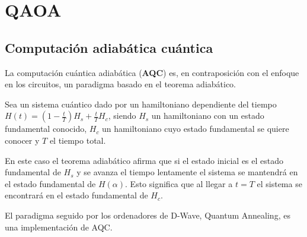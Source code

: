 \section{QAOA}


\subsection{Computación adiabática cuántica}

La computación cuántica adiabática (\textbf{AQC}) es, en contraposición con el enfoque en los circuitos, un paradigma basado en el teorema adiabático.  %

Sea un sistema cuántico dado por un hamiltoniano dependiente del tiempo $H(t) = (1-\frac{t}{T})H_s + \frac{t}{T}H_c$, siendo $H_s$ un hamiltoniano con un estado fundamental conocido, $H_c$ un hamiltoniano cuyo estado fundamental se quiere conocer y $T$ el tiempo total.

En este caso el teorema adiabático afirma que si el estado inicial es el estado fundamental de $H_s$ y se avanza el tiempo lentamente el sistema se mantendrá en el estado fundamental de $H(\alpha)$. Esto significa que al llegar a $t=T$ el sistema se encontrará en el estado fundamental de $H_c$.

El paradigma seguido por los ordenadores de D-Wave, Quantum Annealing, es una implementación de AQC.


